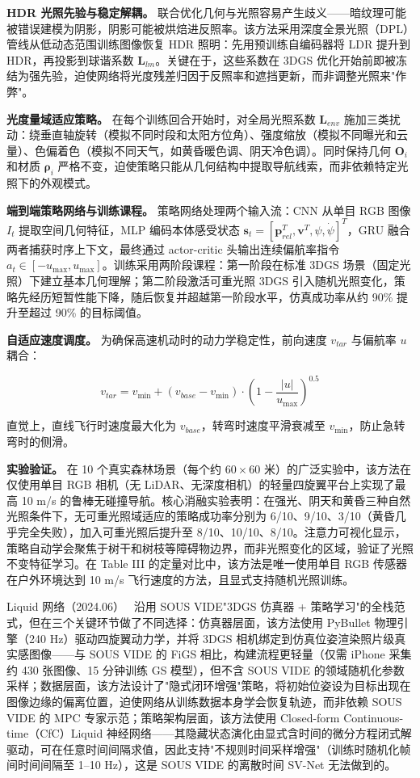 \textbf{HDR 光照先验与稳定解耦。}
联合优化几何与光照容易产生歧义——暗纹理可能被错误建模为阴影，阴影可能被烘焙进反照率。该方法采用深度全景光照（DPL）管线从低动态范围训练图像恢复 HDR 照明：先用预训练自编码器将 LDR 提升到 HDR，再投影到球谐系数 $\mathbf{L}_{lm}$。关键在于，这些系数在 3DGS 优化开始前即被冻结为强先验，迫使网络将光度残差归因于反照率和遮挡更新，而非调整光照来"作弊"。

\textbf{光度量域适应策略。}
在每个训练回合开始时，对全局光照系数 $\mathbf{L}_{env}$ 施加三类扰动：绕垂直轴旋转（模拟不同时段和太阳方位角）、强度缩放（模拟不同曝光和云量）、色偏着色（模拟不同天气，如黄昏暖色调、阴天冷色调）。同时保持几何 $\mathbf{O}_i$ 和材质 $\boldsymbol{\rho}_i$ 严格不变，迫使策略只能从几何结构中提取导航线索，而非依赖特定光照下的外观模式。

\textbf{端到端策略网络与训练课程。}
策略网络处理两个输入流：CNN 从单目 RGB 图像 $I_t$ 提取空间几何特征，MLP 编码本体感受状态 $\mathbf{s}_t = [\mathbf{p}_{rel}^T, \mathbf{v}^T, \psi, \dot{\psi}]^T$，GRU 融合两者捕获时序上下文，最终通过 actor-critic 头输出连续偏航率指令 $a_t \in [-u_{\max}, u_{\max}]$。训练采用两阶段课程：第一阶段在标准 3DGS 场景（固定光照）下建立基本几何理解；第二阶段激活可重光照 3DGS 引入随机光照变化，策略先经历短暂性能下降，随后恢复并超越第一阶段水平，仿真成功率从约 90\% 提升至超过 90\% 的目标阈值。

\textbf{自适应速度调度。}
为确保高速机动时的动力学稳定性，前向速度 $v_{tar}$ 与偏航率 $u$ 耦合：

\begin{equation}
v_{tar} = v_{\min} + (v_{base} - v_{\min}) \cdot \left(1 - \frac{|u|}{u_{\max}}\right)^{0.5}
\end{equation}

直觉上，直线飞行时速度最大化为 $v_{base}$，转弯时速度平滑衰减至 $v_{\min}$，防止急转弯时的侧滑。

\textbf{实验验证。}
在 10 个真实森林场景（每个约 $60\times 60$ 米）的广泛实验中，该方法在仅使用单目 RGB 相机（无 LiDAR、无深度相机）的轻量四旋翼平台上实现了最高 10 m/s 的鲁棒无碰撞导航。核心消融实验表明：在强光、阴天和黄昏三种自然光照条件下，无可重光照域适应的策略成功率分别为 6/10、9/10、3/10（黄昏几乎完全失败），加入可重光照后提升至 8/10、10/10、8/10。注意力可视化显示，策略自动学会聚焦于树干和树枝等障碍物边界，而非光照变化的区域，验证了光照不变特征学习。在 Table III 的定量对比中，该方法是唯一使用单目 RGB 传感器在户外环境达到 10 m/s 飞行速度的方法，且显式支持随机光照训练。

Liquid 网络（2024.06）~\cite{2406_15149} 沿用 SOUS VIDE"3DGS 仿真器 + 策略学习"的全栈范式，但在三个关键环节做了不同选择：仿真器层面，该方法使用 PyBullet 物理引擎（240 Hz）驱动四旋翼动力学，并将 3DGS 相机绑定到仿真位姿渲染照片级真实感图像——与 SOUS VIDE 的 FiGS 相比，构建流程更轻量（仅需 iPhone 采集约 430 张图像、15 分钟训练 GS 模型），但不含 SOUS VIDE 的领域随机化参数采样；数据层面，该方法设计了"隐式闭环增强"策略，将初始位姿设为目标出现在图像边缘的偏离位置，迫使网络从训练数据本身学会恢复轨迹，而非依赖 SOUS VIDE 的 MPC 专家示范；策略架构层面，该方法使用 Closed-form Continuous-time（CfC）Liquid 神经网络——其隐藏状态演化由显式含时间的微分方程闭式解驱动，可在任意时间间隔求值，因此支持"不规则时间采样增强"（训练时随机化帧间时间间隔至 1--10 Hz），这是 SOUS VIDE 的离散时间 SV-Net 无法做到的。


